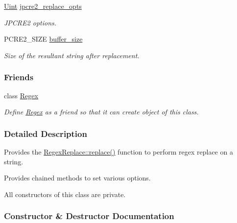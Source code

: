 \begin{DoxyCompactItemize}
\hypertarget{classjpcre2_1_1RegexReplace_acf13bcb16918df4b7bcaa7e49a1c7d59}{}\label{classjpcre2_1_1RegexReplace_acf13bcb16918df4b7bcaa7e49a1c7d59} 
\hyperlink{namespacejpcre2_a078242d38221a13fb3543b9edd78c099}{Uint} \hyperlink{classjpcre2_1_1RegexReplace_acf13bcb16918df4b7bcaa7e49a1c7d59}{jpcre2\+\_\+replace\+\_\+opts}
\begin{DoxyCompactList}\small\item\em J\+P\+C\+R\+E2 options. \end{DoxyCompactList}\item 
P\+C\+R\+E2\+\_\+\+S\+I\+ZE \hyperlink{classjpcre2_1_1RegexReplace_a44abce541819ceb51e342411b48e95cb_a44abce541819ceb51e342411b48e95cb}{buffer\+\_\+size}
\begin{DoxyCompactList}\small\item\em Size of the resultant string after replacement. \end{DoxyCompactList}\end{DoxyCompactItemize}
\subsubsection*{Friends}
\begin{DoxyCompactItemize}
\item 
\hypertarget{classjpcre2_1_1RegexReplace_a1f6f7620b7d2218c6c2a6a47f432ea6a}{}\label{classjpcre2_1_1RegexReplace_a1f6f7620b7d2218c6c2a6a47f432ea6a} 
class \hyperlink{classjpcre2_1_1RegexReplace_a1f6f7620b7d2218c6c2a6a47f432ea6a}{Regex}
\begin{DoxyCompactList}\small\item\em Define \hyperlink{classjpcre2_1_1Regex}{Regex} as a friend so that it can create object of this class. \end{DoxyCompactList}\end{DoxyCompactItemize}


\subsubsection{Detailed Description}
Provides the \hyperlink{classjpcre2_1_1RegexReplace_afd087fa7a9bfedec802d1a3dd7edbdd0_afd087fa7a9bfedec802d1a3dd7edbdd0}{Regex\+Replace\+::replace()} function to perform regex replace on a string. 

Provides chained methods to set various options.

All constructors of this class are private. 

\subsubsection{Constructor \& Destructor Documentation}
\hypertarget{classjpcre2_1_1RegexReplace_ac50687b874800c827a6fa623b9b35753_ac50687b874800c827a6fa623b9b35753}{}\label{classjpcre2_1_1RegexReplace_ac50687b874800c827a6fa623b9b35753_ac50687b874800c827a6fa623b9b35753} 
